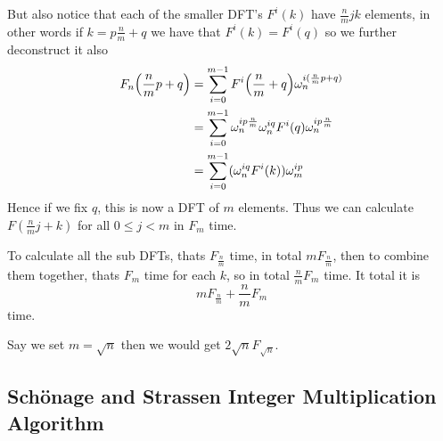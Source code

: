 But also notice that each of the smaller DFT's $F^i(k)$ have $\frac{n}{m}jk$ elements, in other words if $k = p\frac{n}{m} + q$ we have that $F^i(k) = F^i(q)$ so we further deconstruct it also
\begin{align*}
    F_n\bb{\frac{n}{m}p + q} &= \sum^{m-1}_{i=0} F^i\bb{\frac{n}{m} + q}\omega^{i(\frac{n}{m}p + q)}_n\\
    &= \sum^{m-1}_{i=0} \omega^{ip\frac{n}{m}}_n \omega_n^{iq} F^i(q)\omega^{ip\frac{n}{m}}_n\\
    &= \sum^{m-1}_{i=0} (\omega^{iq}_n F^i(k))\omega^{ip}_m\\
\end{align*}
Hence if we fix $q$, this is now a DFT of $m$ elements. Thus we can calculate $F(\frac{n}{m}j + k)$ for all $0 \leq j < m$ in $F_m$ time.

To calculate all the sub DFTs, thats $F_{\frac{n}{m}}$ time, in total $mF_{\frac{n}{m}}$, then to combine them together, thats $F_{m}$ time for each $k$, so in total $\frac{n}{m}F_m$ time. It total it is 
\[
    mF_{\frac{n}{m}} + \frac{n}{m}F_m    
\]
time.

Say we set $m = \sqrt{n}$ then we would get $2\sqrt{n}F_{\sqrt{n}}$. 

\subsection{Sch\"{o}nage and Strassen Integer Multiplication Algorithm}
\label{subsec:schon-strass}



